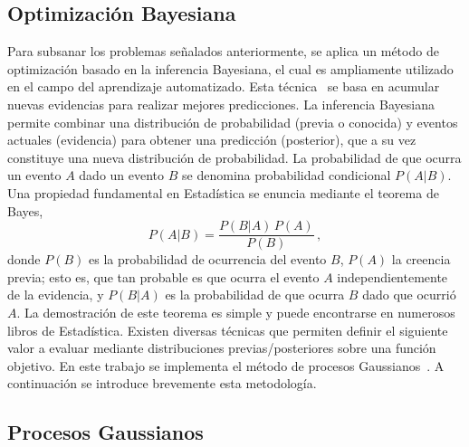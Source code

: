 \subsection{Optimización Bayesiana}
\label{sec:gaussianprocess}

Para subsanar los problemas señalados anteriormente, se aplica un método 
de optimización basado en la inferencia Bayesiana, el cual es 
ampliamente utilizado en el campo del aprendizaje automatizado. Esta 
técnica~\cite{Gelman:13,Barber:12} se basa en acumular nuevas evidencias 
para realizar mejores predicciones. La inferencia Bayesiana permite 
combinar una distribución de probabilidad (previa o conocida) y eventos 
actuales (evidencia) para obtener una predicción (posterior), que a su 
vez constituye una nueva distribución de probabilidad. La probabilidad 
de que ocurra un evento $A$ dado un evento $B$ se denomina probabilidad 
condicional $P(A|B)$. Una propiedad fundamental en Estadística se 
enuncia mediante el teorema de Bayes,
\begin{equation}
P(A|B)=\frac{P(B|A)\,P(A)}{P(B)}\,,
\end{equation}
donde $P(B)$ es la probabilidad de ocurrencia del evento $B$, $P(A)$ la
creencia previa; esto es, que tan probable es que ocurra el evento $A$
independientemente de la evidencia, y $P(B|A)$ es la probabilidad de que
ocurra $B$ dado que ocurrió $A$. La demostración de este teorema es 
simple y puede encontrarse en numerosos libros de Estadística. 
Existen diversas técnicas que permiten definir el siguiente valor a 
evaluar mediante distribuciones previas/posteriores sobre una función 
objetivo. En este trabajo se implementa el método de procesos 
Gaussianos~\cite{Bergstra:11}. A continuación se introduce brevemente
esta metodología.

\subsection{Procesos Gaussianos}

